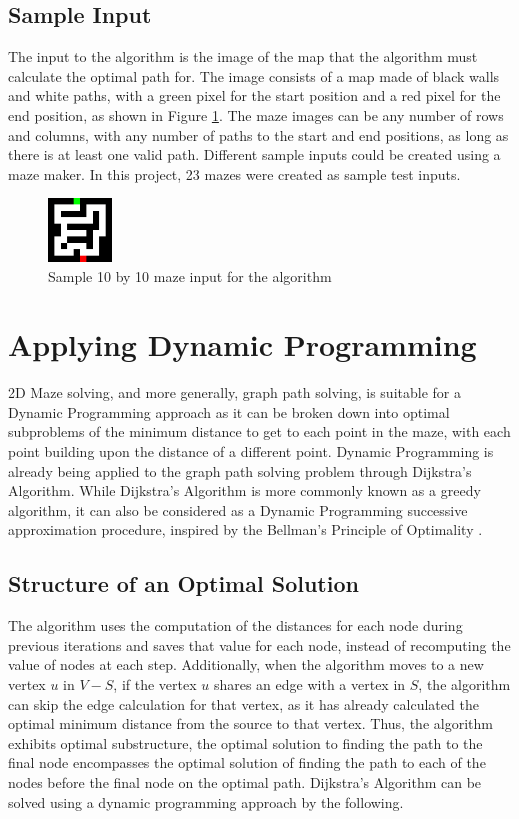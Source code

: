 \documentclass[11pt]{article}
\begin{document}
\begin{multicols}{2}
	\subsection{Sample Input}
	The input to the algorithm is the image of the map that the algorithm must calculate the optimal path for. The image
	consists of a map made of black walls and white paths, with a green pixel for the start position and a red pixel for the end
	position, as shown in Figure \ref{fig:maze}. The maze images can be any number of rows and columns, with any number of paths to the
	start and end positions, as long as there is at least one valid path. Different sample inputs could
	be created using a maze maker. In this project, 23 mazes were created as sample test inputs.
	\begin{figure}[H]
		\centering
		\includegraphics[width=0.15\textwidth]{"figures/maze_10x10.png"}
		\caption{Sample 10 by 10 maze input for the algorithm\label{fig:maze}}
	\end{figure}

	\section{Applying Dynamic Programming}
	2D Maze solving, and more generally, graph path solving, is suitable for a Dynamic Programming approach as it can be broken down into
	optimal subproblems of the minimum distance to get to each point in the maze, with each point
	building upon the distance of a different point. Dynamic Programming is already being applied to
	the graph path solving problem through Dijkstra's Algorithm. While Dijkstra's Algorithm is more commonly known as a greedy algorithm, it can also
	be
	considered as
	a Dynamic Programming successive approximation procedure, inspired by the Bellman's Principle of
	Optimality \cite{sniedovich_dijkstras_nodate}.

	\subsection{Structure of an Optimal Solution}
	The algorithm uses the computation of the
	distances for each node during previous iterations and saves that value for each node, instead
	of recomputing the value of nodes at each step. Additionally, when the algorithm moves to a new
	vertex ${u}$ in ${V - S}$, if the vertex ${u}$ shares an edge with a vertex in ${S}$, the
	algorithm can skip the edge calculation for that vertex, as it has already calculated the
	optimal minimum distance from the source to that vertex. Thus, the algorithm exhibits optimal
	substructure, the optimal solution to finding the path to the final node encompasses the optimal
	solution of finding the path to each of the nodes before the final node on the optimal path.
	Dijkstra's Algorithm can be solved using a dynamic programming approach by the following.


\end{multicols}
\end{document}
